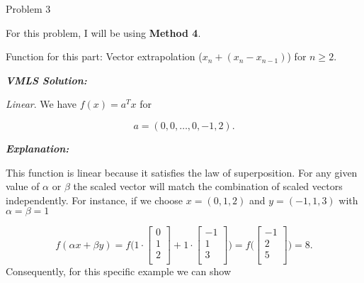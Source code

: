 \begin{problem}{Problem 3}
    \begin{highlight}
        For this problem, I will be using \textbf{Method 4}. \vspace*{1em}

        Function for this part: Vector extrapolation ($x_{n} + (x_{n} - x_{n-1})$) for $n \geq 2$. \vspace*{1em}

        \textbf{\textit{VMLS Solution:}} \vspace*{1em}

        \textit{Linear}. We have $f(x) = a^{T}x$ for 
        
        \begin{equation}
            a = (0,0,\dots,0,-1,2).
        \end{equation}

        \textbf{\textit{Explanation:}} \vspace*{1em}

        This function is linear because it satisfies the law of superposition. For any given value of $\alpha$ or $\beta$ the scaled vector will match the combination of scaled vectors independently.
        For instance, if we choose $x = (0,1,2)$ and $y = (-1,1,3)$ with $\alpha = \beta = 1$

        \begin{equation}
            f(\alpha x + \beta y) = f \Bigg(
                1 \cdot 
                \begin{bmatrix}
                    0 \\
                    1 \\
                    2 \\
                \end{bmatrix}
                + 1 \cdot 
                \begin{bmatrix}
                    -1 \\
                    1 \\
                    3 \\
                \end{bmatrix}
                \Bigg) = f \Bigg(
                \begin{bmatrix}
                    -1 \\
                    2 \\
                    5 \\
                \end{bmatrix}
                \Bigg) = 8.
        \end{equation}
        Consequently, for this specific example we can show


\end{highlight}
\end{problem}
